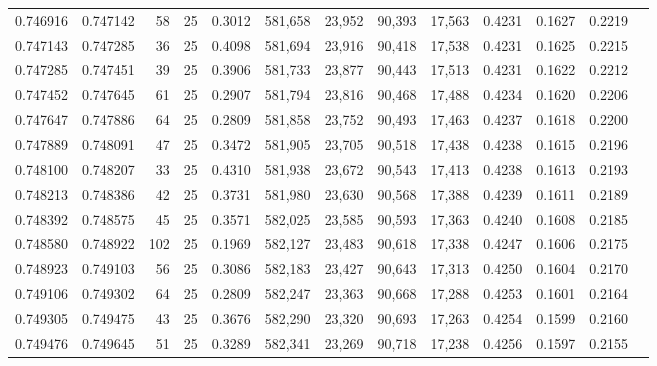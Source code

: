 \begin{tabular}{rrrrrrrrrrrrr}
0.746916 & 0.747142 &    58 &  25 &                                     0.3012 & 581,658 &  23,952 &  90,393 &  17,563 & 0.4231 & 0.1627 & 0.2219 \\
0.747143 & 0.747285 &    36 &  25 &                                     0.4098 & 581,694 &  23,916 &  90,418 &  17,538 & 0.4231 & 0.1625 & 0.2215 \\
0.747285 & 0.747451 &    39 &  25 &                                     0.3906 & 581,733 &  23,877 &  90,443 &  17,513 & 0.4231 & 0.1622 & 0.2212 \\
0.747452 & 0.747645 &    61 &  25 &                                     0.2907 & 581,794 &  23,816 &  90,468 &  17,488 & 0.4234 & 0.1620 & 0.2206 \\
0.747647 & 0.747886 &    64 &  25 &                                     0.2809 & 581,858 &  23,752 &  90,493 &  17,463 & 0.4237 & 0.1618 & 0.2200 \\
0.747889 & 0.748091 &    47 &  25 &                                     0.3472 & 581,905 &  23,705 &  90,518 &  17,438 & 0.4238 & 0.1615 & 0.2196 \\
0.748100 & 0.748207 &    33 &  25 &                                     0.4310 & 581,938 &  23,672 &  90,543 &  17,413 & 0.4238 & 0.1613 & 0.2193 \\
0.748213 & 0.748386 &    42 &  25 &                                     0.3731 & 581,980 &  23,630 &  90,568 &  17,388 & 0.4239 & 0.1611 & 0.2189 \\
0.748392 & 0.748575 &    45 &  25 &                                     0.3571 & 582,025 &  23,585 &  90,593 &  17,363 & 0.4240 & 0.1608 & 0.2185 \\
0.748580 & 0.748922 &   102 &  25 &                                     0.1969 & 582,127 &  23,483 &  90,618 &  17,338 & 0.4247 & 0.1606 & 0.2175 \\
0.748923 & 0.749103 &    56 &  25 &                                     0.3086 & 582,183 &  23,427 &  90,643 &  17,313 & 0.4250 & 0.1604 & 0.2170 \\
0.749106 & 0.749302 &    64 &  25 &                                     0.2809 & 582,247 &  23,363 &  90,668 &  17,288 & 0.4253 & 0.1601 & 0.2164 \\
0.749305 & 0.749475 &    43 &  25 &                                     0.3676 & 582,290 &  23,320 &  90,693 &  17,263 & 0.4254 & 0.1599 & 0.2160 \\
0.749476 & 0.749645 &    51 &  25 &                                     0.3289 & 582,341 &  23,269 &  90,718 &  17,238 & 0.4256 & 0.1597 & 0.2155 \\

\end{tabular}
